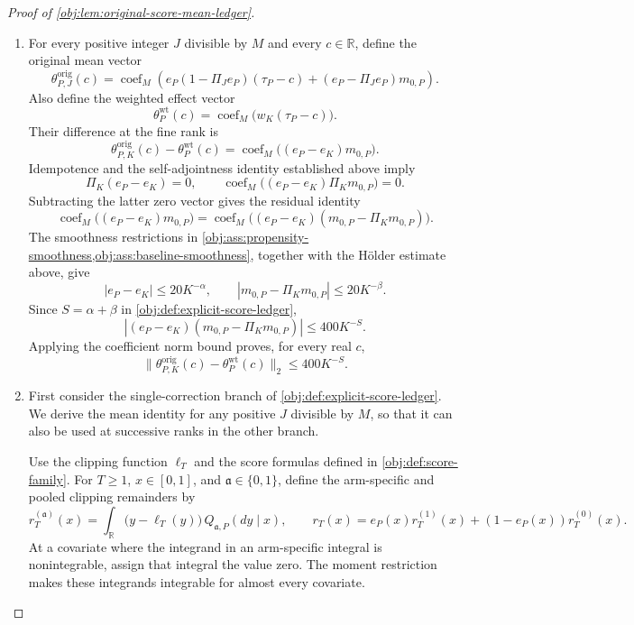 \begin{proof}[Proof of \cref{obj:lem:original-score-mean-ledger}]
\begin{enumerate}
\item
For every positive integer \(J\) divisible by \(M\) and every \(c\in\mathbb R\), define the original mean vector
\[
\theta^{\mathrm{orig}}_{P,J}(c)
=
\operatorname{coef}_M\!\left(
e_P(1-\Pi_Je_P)(\tau_P-c)
+(e_P-\Pi_Je_P)m_{0,P}
\right).
\]
Also define the weighted effect vector
\[
\theta^{\mathrm{wt}}_P(c)
=
\operatorname{coef}_M\bigl(w_K(\tau_P-c)\bigr).
\]
Their difference at the fine rank is
\[
\theta^{\mathrm{orig}}_{P,K}(c)-\theta^{\mathrm{wt}}_P(c)
=
\operatorname{coef}_M\bigl((e_P-e_K)m_{0,P}\bigr).
\]
Idempotence and the self-adjointness identity established above imply
\[
\Pi_K(e_P-e_K)=0,
\qquad
\operatorname{coef}_M\bigl((e_P-e_K)\Pi_Km_{0,P}\bigr)=0.
\]
Subtracting the latter zero vector gives the residual identity
\[
\operatorname{coef}_M\bigl((e_P-e_K)m_{0,P}\bigr)
=
\operatorname{coef}_M\bigl(
(e_P-e_K)(m_{0,P}-\Pi_Km_{0,P})
\bigr).
\]
The smoothness restrictions in
\cref{obj:ass:propensity-smoothness,obj:ass:baseline-smoothness},
together with the Hölder estimate above, give
\[
|e_P-e_K|\le20K^{-\alpha},
\qquad
|m_{0,P}-\Pi_Km_{0,P}|\le20K^{-\beta}.
\]
Since \(S=\alpha+\beta\) in \cref{obj:def:explicit-score-ledger},
\[
\left|(e_P-e_K)(m_{0,P}-\Pi_Km_{0,P})\right|
\le400K^{-S}.
\]
Applying the coefficient norm bound proves, for every real \(c\),
\[
\|\theta^{\mathrm{orig}}_{P,K}(c)-\theta^{\mathrm{wt}}_P(c)\|_2
\le400K^{-S}.
\]

\item
First consider the single-correction branch of
\cref{obj:def:explicit-score-ledger}. We derive the mean identity for any positive \(J\) divisible by \(M\), so that it can also be used at successive ranks in the other branch.

Use the clipping function \(\ell_T\) and the score formulas defined in \cref{obj:def:score-family}. For \(T\ge1\), \(x\in[0,1]\), and \(\mathfrak a\in\{0,1\}\), define the arm-specific and pooled clipping remainders by
\[
r_T^{(\mathfrak a)}(x)
=
\int_{\mathbb R}\bigl(y-\ell_T(y)\bigr)
\,Q_{\mathfrak a,P}(dy\mid x),
\qquad
r_T(x)
=
e_P(x)r_T^{(1)}(x)+(1-e_P(x))r_T^{(0)}(x).
\]
At a covariate where the integrand in an arm-specific integral is nonintegrable, assign that integral the value zero. The moment restriction makes these integrands integrable for almost every covariate.


\end{enumerate}
\end{proof}

